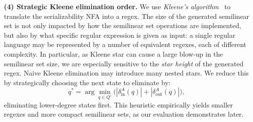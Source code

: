 
\medskip
\noindent
\textbf{(4) Strategic Kleene elimination order.} 
%
We use \textit{Kleene's algorithm}~\cite{Kl56} to translate the serializability NFA into a regex.
% 
The size of the generated semilinear set is not only impacted by how the
	semilinear set operations are implemented, but also by what specific regular
	expression is given as input: a single regular language may be represented by a
	number of equivalent regexes, each of different complexity.
	In particular, as Kleene star can cause a large blow-up in the semilinear set size,
	we are especially sensitive to the \emph{star height} of the generated regex.
	Naive Kleene elimination may introduce many nested stars.  
	We reduce this by strategically choosing the next state to eliminate by:
	\[
	q^*=\arg\min_{q\in Q'}\bigl(|\delta^A_{\mathrm{in}}(q)|+|\delta^A_{\mathrm{out}}(q)|\bigr),
	\]
	eliminating lower-degree states first.  
	This heuristic empirically yields smaller regexes and more compact semilinear sets, as our evaluation demonstrates later.



